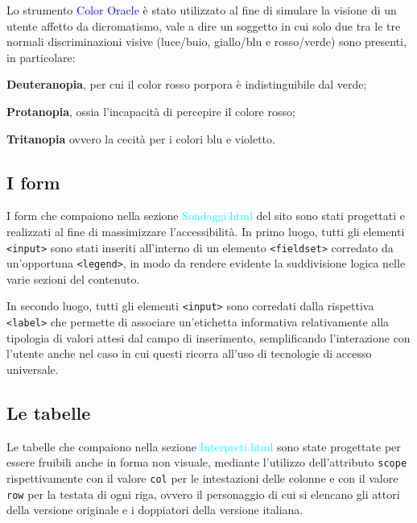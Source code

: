 \documentclass[10pt,a4paper,onecolumn]{article}
\newcommand{\sitepage}[1]{\textcolor{cyan}{\textsf{#1}}}
\newcommand{\progname}[1]{\textcolor{blue}{\textsf{#1}}}
\begin{document}
Lo strumento \progname{Color Oracle} è stato utilizzato al fine di simulare la visione di un utente affetto da dicromatismo, vale a dire un soggetto in cui solo due tra le tre normali discriminazioni visive (luce/buio, giallo/blu e rosso/verde) sono presenti, in particolare:
\begin{description}
  \item{\textbf{Deuteranopia}}, per cui il color rosso porpora è indistinguibile dal verde;
  \item{\textbf{Protanopia}}, ossia l'incapacità di percepire il colore rosso;
  \item{\textbf{Tritanopia}} ovvero la cecità per i colori blu e violetto.
\end{description}


\subsection{I form}
I form che compaiono nella sezione \sitepage{Sondaggi.html} del sito sono stati progettati e realizzati al fine di massimizzare l'accessibilità. In primo luogo, tutti gli elementi \texttt{<input>} sono stati inseriti all'interno di un elemento \texttt{<fieldset>} corredato da un'opportuna \texttt{<legend>}, in modo da rendere evidente la suddivisione logica nelle varie sezioni del contenuto.

In secondo luogo, tutti gli elementi \texttt{<input>} sono corredati dalla rispettiva \texttt{<label>} che permette di associare un'etichetta informativa relativamente alla tipologia di valori attesi dal campo di inserimento, semplificando l'interazione con l'utente anche nel caso in cui questi ricorra all'uso di tecnologie di accesso universale.


\subsection{Le tabelle}
Le tabelle che compaiono nella sezione \sitepage{Interpreti.html} sono state progettate per essere fruibili anche in forma non visuale, mediante l'utilizzo dell'attributo \texttt{scope} rispettivamente con il valore \texttt{col} per le intestazioni delle colonne e con il valore \texttt{row} per la testata di ogni riga, ovvero il personaggio di cui si elencano gli attori della versione originale e i doppiatori della versione italiana.
\end{document}
